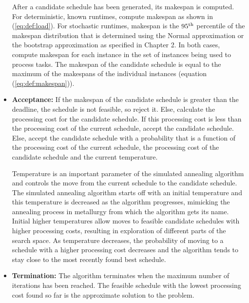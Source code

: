 \documentclass[12pt]{report}
\begin{document}
\begin{itemize}
		After a candidate schedule has been generated, its makespan is computed.
		For deterministic, known runtimes, compute makespan as shown in (\ref{eq:def:load}).
		For stochastic runtimes, makespan is the $95\textsuperscript{th}$ percentile of the makespan distribution that is determined using the Normal approximation or the bootstrap approximation as specified in Chapter 2.  
		In both cases, compute makespan for each instance in the set of instances being used to process tasks. 
		The makespan of the candidate schedule is equal to the maximum of the makespans of the individual instances (equation (\ref{eq:def:makespan})).
	\item \textbf{Acceptance:} If the makespan of the candidate schedule is greater than the deadline, the schedule is not feasible, so reject it.
		Else, calculate the processing cost for the candidate schedule.
		If this processing cost is less than the processing cost of the current schedule, accept the candidate schedule.
		Else, accept the candidate schedule with a probability that is a function of the processing cost of the current schedule, the processing cost of the candidate schedule and the current temperature.
		
		Temperature is an important parameter of the simulated annealing algorithm and controls the move from the current schedule to the candidate schedule. 
		The simulated annealing algorithm starts off with an initial temperature and this temperature is decreased as the algorithm progresses, mimicking the annealing process in metallurgy from which the algorithm gets its name.
		Initial higher temperatures allow moves to feasible candidate schedules with higher processing costs, resulting in exploration of different parts of the search space.
		As temperature decreases, the probability of moving to a schedule with a higher processing cost decreases and the algorithm tends to stay close to the most recently found best schedule.
		
	\item \textbf{Termination:} The algorithm terminates when the maximum number of iterations has been reached. The feasible schedule with the lowest processing cost found so far is the approximate solution to the problem.
\end{itemize}
\end{document}
